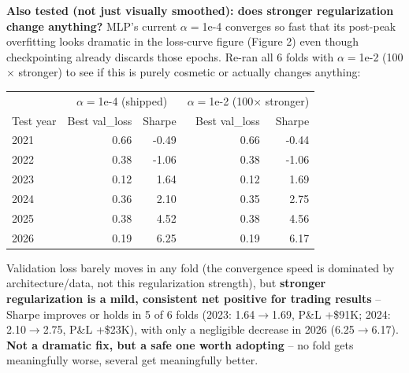 \documentclass[11pt]{article}
\begin{document}
\textbf{Also tested (not just visually smoothed): does stronger regularization change anything?} MLP's
current $\alpha=$1e-4 converges so fast that its post-peak overfitting looks dramatic in the loss-curve
figure (Figure 2) even though checkpointing already discards those epochs. Re-ran all 6 folds with
$\alpha=$1e-2 (100$\times$ stronger) to see if this is purely cosmetic or actually changes anything:
\begin{table}[H]
\centering
\begin{tabular}{lrrrr}
\toprule
& \multicolumn{2}{c}{$\alpha=$1e-4 (shipped)} & \multicolumn{2}{c}{$\alpha=$1e-2 (100$\times$ stronger)} \\
Test year & Best val\_loss & Sharpe & Best val\_loss & Sharpe \\
\midrule
2021 & 0.66 & -0.49 & 0.66 & -0.44 \\
2022 & 0.38 & -1.06 & 0.38 & -1.06 \\
2023 & 0.12 & 1.64 & 0.12 & 1.69 \\
2024 & 0.36 & 2.10 & 0.35 & 2.75 \\
2025 & 0.38 & 4.52 & 0.38 & 4.56 \\
2026 & 0.19 & 6.25 & 0.19 & 6.17 \\
\bottomrule
\end{tabular}
\end{table}
Validation loss barely moves in any fold (the convergence speed is dominated by architecture/data, not this
regularization strength), but \textbf{stronger regularization is a mild, consistent net positive for
trading results} -- Sharpe improves or holds in 5 of 6 folds (2023: 1.64$\to$1.69, P\&L +\$91K; 2024:
2.10$\to$2.75, P\&L +\$23K), with only a negligible decrease in 2026 (6.25$\to$6.17). \textbf{Not a dramatic
fix, but a safe one worth adopting} -- no fold gets meaningfully worse, several get meaningfully better.
\end{document}
